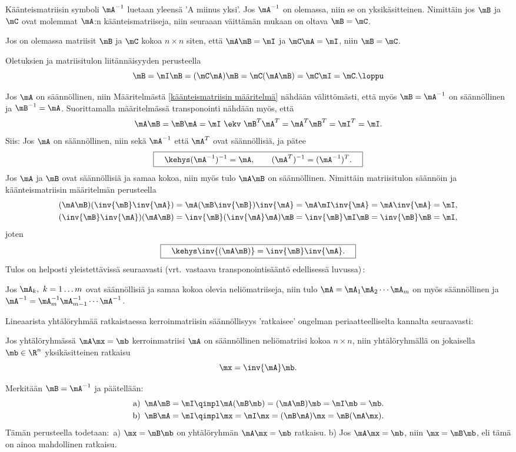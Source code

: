 Käänteismatriisin symboli $\mA^{-1}$ luetaan yleensä 'A miinus yksi'. Jos $\mA^{-1}$ on
olemassa, niin se on yksikäsitteinen. Nimittäin jos $\mB$ ja $\mC$ ovat molemmat $\mA$:n
käänteismatriiseja, niin seuraaan väittämän mukaan on oltava $\mB=\mC$.
\begin{Prop} \label{m-prop 1} Jos on olemassa matriisit $\mB$ ja $\mC$ kokoa $n \times n$
siten, että $\mA\mB=\mI$ ja $\mC\mA=\mI$, niin $\mB=\mC$.
\end{Prop}
\tod Oletuksien ja matriisitulon liitännäisyyden perusteella
\[
\mB = \mI \mB = (\mC \mA) \mB = \mC (\mA \mB) = \mC \mI = \mC. \loppu
\]

Jos $\mA$ on säännöllinen, niin Määritelmästä \ref{käänteismatriisin määritelmä} nähdään 
välittömästi, että myös $\mB=\mA^{-1}$ on säännöllinen ja $\mB^{-1}=\mA$. Suorittamalla 
määritelmässä transponointi nähdään myös, että
\[
\mA \mB = \mB \mA = \mI \ \ekv \ \mB^T \mA^T = \mA^T \mB^T = \mI^T = \mI.
\]
Siis: Jos $\mA$ on säännöllinen, niin sekä $\mA^{-1}$ että $\mA^T$ ovat säännöllisiä, ja pätee
\[
\boxed{\quad\kehys (\mA^{-1})^{-1}=\mA, \qquad (\mA^T)^{-1} = (\mA^{-1})^T. \quad}
\]
Jos $\mA$ ja $\mB$ ovat säännöllisiä ja samaa kokoa, niin myös tulo $\mA \mB$ on säännöllinen.
Nimittäin matriisitulon säännöin ja käänteismatriisin määritelmän perusteella
\begin{align*}
(\mA \mB)(\inv{\mB}\inv{\mA}) &= \mA(\mB \inv{\mB})\inv{\mA} 
                               = \mA \mI \inv{\mA} = \mA \inv{\mA} = \mI, \\
(\inv{\mB}\inv{\mA})(\mA \mB) &= \inv{\mB}(\inv{\mA} \mA)\mB 
                               = \inv{\mB} \mI \mB = \inv{\mB} \mB = \mI,
\end{align*}
joten
\[
\boxed{\quad\kehys \inv{(\mA \mB)} = \inv{\mB} \inv{\mA}. \quad}
\]
Tulos on helposti yleistettävissä seuraavasti (vrt.\ vastaava transponointisääntö edellisessä
luvussa)\,:
\begin{Prop} \label{matriisitulon säännöllisyys} Jos $\mA_k,\ k=1 \ldots m$ ovat säännöllisiä
ja samaa kokoa olevia neliömatriiseja, niin tulo $\mA=\mA_1\mA_2 \cdots \mA_m$ on myös 
säännöllinen ja $\mA^{-1}=\mA_m^{-1}\mA_{m-1}^{-1} \cdots \mA^{-1}$.
\end{Prop} 

Lineaarista yhtälöryhmää ratkaistaessa kerroinmatriisin säännöllisyys 'ratkaisee' ongelman 
periaatteelliselta kannalta seuraavasti:
\begin{Prop} \label{kerroinmatriisi} Jos yhtälöryhmässä $\mA\mx=\mb$ kerroinmatriisi $\mA$ on
säännöllinen neliömatriisi kokoa $n \times n$, niin yhtälöryhmällä on jokaisella $\mb \in \R^n$
yksikäsitteinen ratkaisu
\[
\mx = \inv{\mA} \mb.
\]
\end{Prop}
\tod Merkitään $\mB=\mA^{-1}$ ja päätellään:
\begin{align*}
\text{a)}\,\ \mA\mB=\mI &\qimpl \mA(\mB\mb) = (\mA\mB)\mb = \mI\mb = \mb. \\
\text{b)}\,\ \mB\mA=\mI &\qimpl \mx = \mI\mx = (\mB\mA)\mx = \mB(\mA\mx). 
\end{align*}
Tämän perusteella todetaan:\, a) $\mx=\mB\mb$ on yhtälöryhmän $\mA\mx=\mb$ ratkaisu.\newline
b) Jos $\mA\mx=\mb$, niin $\mx=\mB\mb$, eli tämä on ainoa mahdollinen ratkaisu. \loppu

